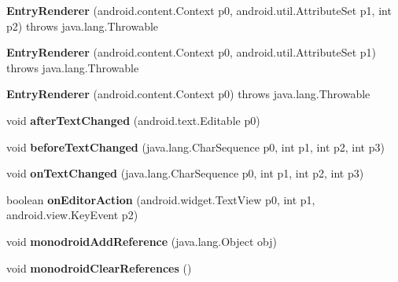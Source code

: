 \begin{DoxyCompactItemize}
\item 
\mbox{\label{classmd5b60ffeb829f638581ab2bb9b1a7f4f3f_1_1_entry_renderer_ac9f1e77924196c3ec66c66643a42d20c}} 
{\bfseries Entry\+Renderer} (android.\+content.\+Context p0, android.\+util.\+Attribute\+Set p1, int p2)  throws java.\+lang.\+Throwable 	
\item 
\mbox{\label{classmd5b60ffeb829f638581ab2bb9b1a7f4f3f_1_1_entry_renderer_aa677f29384a087cba52a19f1109b3bb2}} 
{\bfseries Entry\+Renderer} (android.\+content.\+Context p0, android.\+util.\+Attribute\+Set p1)  throws java.\+lang.\+Throwable 	
\item 
\mbox{\label{classmd5b60ffeb829f638581ab2bb9b1a7f4f3f_1_1_entry_renderer_adacbe769cf67a492a9904d4fe314f4f5}} 
{\bfseries Entry\+Renderer} (android.\+content.\+Context p0)  throws java.\+lang.\+Throwable 	
\item 
\mbox{\label{classmd5b60ffeb829f638581ab2bb9b1a7f4f3f_1_1_entry_renderer_abd753a7f1a81e9767e269259f1c38e25}} 
void {\bfseries after\+Text\+Changed} (android.\+text.\+Editable p0)
\item 
\mbox{\label{classmd5b60ffeb829f638581ab2bb9b1a7f4f3f_1_1_entry_renderer_a17c929e5fb1379672df9b6b03f0b9cb4}} 
void {\bfseries before\+Text\+Changed} (java.\+lang.\+Char\+Sequence p0, int p1, int p2, int p3)
\item 
\mbox{\label{classmd5b60ffeb829f638581ab2bb9b1a7f4f3f_1_1_entry_renderer_a8f550bc686abb5ee849838c8139aa969}} 
void {\bfseries on\+Text\+Changed} (java.\+lang.\+Char\+Sequence p0, int p1, int p2, int p3)
\item 
\mbox{\label{classmd5b60ffeb829f638581ab2bb9b1a7f4f3f_1_1_entry_renderer_a099a976db3b379379d84776f7b194fed}} 
boolean {\bfseries on\+Editor\+Action} (android.\+widget.\+Text\+View p0, int p1, android.\+view.\+Key\+Event p2)
\item 
\mbox{\label{classmd5b60ffeb829f638581ab2bb9b1a7f4f3f_1_1_entry_renderer_a874980e2f1e04a1474a4c5ff9a052a13}} 
void {\bfseries monodroid\+Add\+Reference} (java.\+lang.\+Object obj)
\item 
\mbox{\label{classmd5b60ffeb829f638581ab2bb9b1a7f4f3f_1_1_entry_renderer_a5ad12d956145127cb1bb040a5c2d369b}} 
void {\bfseries monodroid\+Clear\+References} ()
\end{DoxyCompactItemize}
